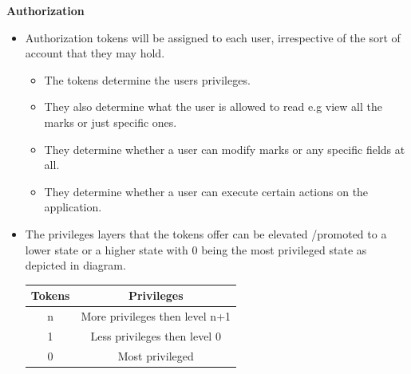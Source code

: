 \documentclass[10pt,a4paper]{article}
\begin{document}
\indent\textbf{Authorization}
                \begin{itemize}
                        \item Authorization tokens will be assigned to each user, irrespective of the sort of account that they may hold.
                        \begin{itemize}
                                \item The tokens determine the users privileges.
                        \end{itemize}
                        \begin{itemize}
                                \item They also determine what the user is allowed to read  e.g view all the marks or just specific ones.
                        \end{itemize}
                        \begin{itemize}
                                \item They determine whether a user can modify marks or any specific fields at all.
                        \end{itemize}
                        \begin{itemize}
                                \item They determine whether a user can execute certain actions on the application.
                        \end{itemize}
                \end{itemize}
                \begin{itemize}
                        \item
                        The privileges layers that the tokens offer can be elevated /promoted to a lower state or a higher state with 0 being the most privileged state as depicted in diagram.\linebreak\linebreak \begin{center}
                        
                        
                        \begin{tabular}{|c|c|}\hline
                        Tokens   & Privileges \\\hline
                        n & More privileges then level n+1\\\hline
                        1 & Less privileges then level 0\\\hline
                        0 & Most privileged\\\hline
                \end{tabular}
                \end{center}
                \end{itemize}
\end{document}
